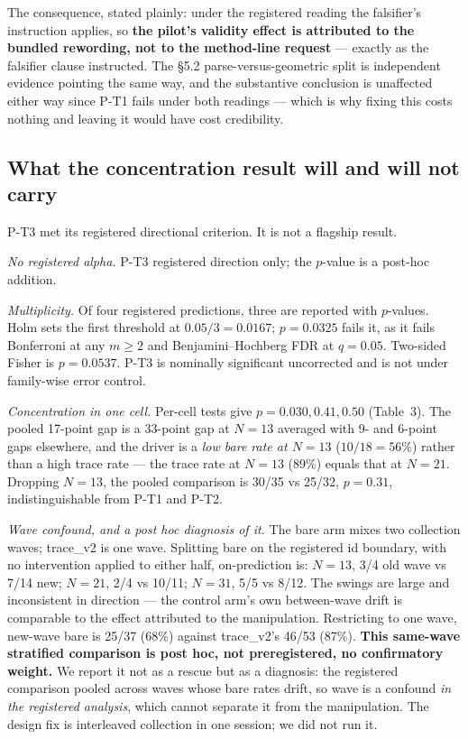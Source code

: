 \documentclass[11pt]{article}
\begin{document}
The consequence, stated plainly: under the registered reading the falsifier's instruction
applies, so \textbf{the pilot's validity effect is attributed to the bundled rewording, not to the
method-line request} --- exactly as the falsifier clause instructed. The \S5.2
parse-versus-geometric split is independent evidence pointing the same way, and the substantive
conclusion is unaffected either way since P-T1 fails under both readings --- which is why fixing
this costs nothing and leaving it would have cost credibility.

\subsection{What the concentration result will and will not carry}

P-T3 met its registered directional criterion. It is not a flagship result.

\textit{No registered alpha.} P-T3 registered direction only; the $p$-value is a post-hoc addition.

\textit{Multiplicity.} Of four registered predictions, three are reported with $p$-values. Holm sets the
first threshold at $0.05/3 = 0.0167$; $p = 0.0325$ fails it, as it fails Bonferroni at any $m \ge 2$ and
Benjamini--Hochberg FDR at $q = 0.05$. Two-sided Fisher is $p = 0.0537$. P-T3 is nominally
significant uncorrected and is not under family-wise error control.

\textit{Concentration in one cell.} Per-cell tests give $p = 0.030, 0.41, 0.50$ (Table~3). The pooled
17-point gap is a 33-point gap at $N = 13$ averaged with 9- and 6-point gaps elsewhere, and the
driver is a \textit{low bare rate at $N = 13$} ($10/18 = 56\%$) rather than a high trace rate --- the trace
rate at $N = 13$ (89\%) equals that at $N = 21$. Dropping $N = 13$, the pooled comparison is 30/35 vs
25/32, $p = 0.31$, indistinguishable from P-T1 and P-T2.

\textit{Wave confound, and a post hoc diagnosis of it.} The bare arm mixes two collection waves;
trace\_v2 is one wave. Splitting bare on the registered id boundary, with no intervention applied
to either half, on-prediction is: $N = 13$, 3/4 old wave vs 7/14 new; $N = 21$, 2/4 vs 10/11;
$N = 31$, 5/5 vs 8/12. The swings are large and inconsistent in direction --- the control arm's own
between-wave drift is comparable to the effect attributed to the manipulation. Restricting to
one wave, new-wave bare is 25/37 (68\%) against trace\_v2's 46/53 (87\%). \textbf{This same-wave
stratified comparison is post hoc, not preregistered, no confirmatory weight.} We report it not
as a rescue but as a diagnosis: the registered comparison pooled across waves whose bare rates
drift, so wave is a confound \textit{in the registered analysis}, which cannot separate it from the
manipulation. The design fix is interleaved collection in one session; we did not run it.
\end{document}
